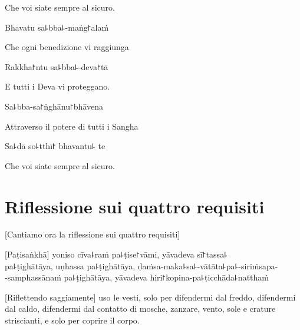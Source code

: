 \begin{english}
Che voi siate sempre al sicuro.
\end{english}

Bhavatu sa꜕bba꜕-maṅg꜓alaṁ

\begin{english}
Che ogni benedizione vi raggiunga
\end{english}

Rakkha꜓ntu sa꜕bba꜕-deva꜓tā

\begin{english}
E tutti i Deva vi proteggano.
\end{english}

Sa꜕bba-sa꜓ṅghānu꜓bhāvena

\begin{english}
  Attraverso il potere di tutti i Sangha
\end{english}

Sa꜕dā so꜕tthī꜓ bhavantu꜕ te

\begin{english}
Che voi siate sempre al sicuro.
\end{english}

\chapter[I quattro requisiti]{Riflessione sui quattro requisiti}


\begin{leader}
\end{leader}

\begin{english}
  [Cantiamo ora la riflessione sui quattro requisiti]
\end{english}

[Paṭisaṅkhā] yoniso cīva꜕raṁ pa꜕ṭise꜓vāmi, yāvadeva sī꜓tassa꜕\\
pa꜕ṭighātāya, uṇhassa pa꜕ṭighātāya, ḍaṁsa-maka꜕sa꜕-vātāta꜕pa꜕-siriṁsapa-\\
-samphassānaṁ pa꜕ṭighātāya, yāvadeva hiri꜓kopina-pa꜕ṭicchāda꜕natthaṁ

\begin{english}
[Riflettendo saggiamente] uso le vesti, solo per difendermi dal freddo, difendermi dal caldo, difendermi dal contatto di mosche, zanzare, vento, sole e crature striscianti, e solo per coprire il corpo.\end{english}

